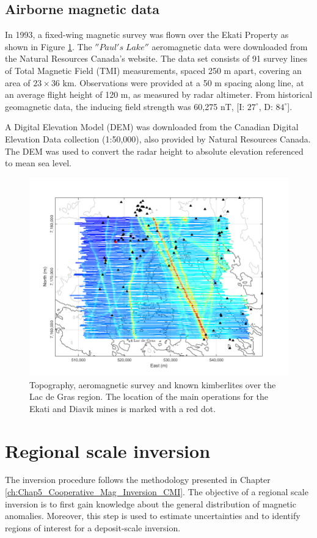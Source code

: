\subsection{Airborne magnetic data}
In 1993, a fixed-wing magnetic survey was flown over the Ekati Property as shown in Figure \ref{fig:Aeromag_Location}.
The $''Paul's\;Lake''$ aeromagnetic data were downloaded from the Natural Resources Canada's website.
The data set consists of 91 survey lines of Total Magnetic Field (TMI) measurements, spaced 250 m apart, covering an area of $23\times36$ km.
Observations were provided at a 50 m spacing along line, at an average flight height of 120 m, as measured by radar altimeter.
From historical geomagnetic data, the inducing field strength was 60,275 nT, [I: $27^{\circ}$, D: $84^{\circ}$].

A Digital Elevation Model (DEM) was downloaded from the Canadian Digital Elevation Data collection (1:50,000), also provided by Natural Resources Canada.
The DEM was used to convert the radar height to absolute elevation referenced to mean sea level.

\begin{figure}[h!]
\includegraphics[scale=0.6]{Aeromag_Location.png}
\caption{Topography, aeromagnetic survey and known kimberlites over the Lac de Gras region. The location of the main operations for the Ekati and Diavik mines is marked with a red dot.}
\label{fig:Aeromag_Location}
\end{figure}


\section{Regional scale inversion}
The inversion procedure follows the methodology presented in Chapter \ref{ch:Chap5_Cooperative_Mag_Inversion_CMI}.
The objective of a regional scale inversion is to first gain knowledge about the general distribution of magnetic anomalies.
Moreover, this step is used to estimate uncertainties and to identify regions of interest for a deposit-scale inversion.

